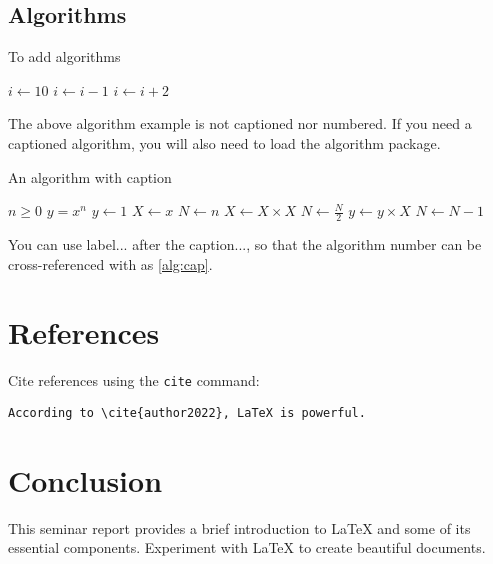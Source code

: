     \subsection{Algorithms}

    To add algorithms
    \begin{algorithmic}
\State $i \gets 10$
    \State $i \gets i-1$
\Else
        \State $i \gets i+2$
    \EndIf
\EndIf
\end{algorithmic}

The above algorithm example is not captioned nor numbered. If you need a captioned algorithm, you will also need to load the algorithm package.

\begin{algorithm}
\caption{An algorithm with caption}\label{alg:cap}
\begin{algorithmic}
\Require $n \geq 0$
\Ensure $y = x^n$
\State $y \gets 1$
\State $X \gets x$
\State $N \gets n$
    \State $X \gets X \times X$
    \State $N \gets \frac{N}{2}$  
    \State $y \gets y \times X$
    \State $N \gets N - 1$
\EndIf
\EndWhile
\end{algorithmic}
\end{algorithm}

You can use label{...} after the caption{...}, so that the algorithm number can be cross-referenced with as \ref{alg:cap}.


\section{References}
Cite references using the \texttt{cite} command:
\begin{verbatim}
According to \cite{author2022}, LaTeX is powerful.
\end{verbatim}

\section{Conclusion}
This seminar report provides a brief introduction to LaTeX and some of its essential components. Experiment with LaTeX to create beautiful documents.
